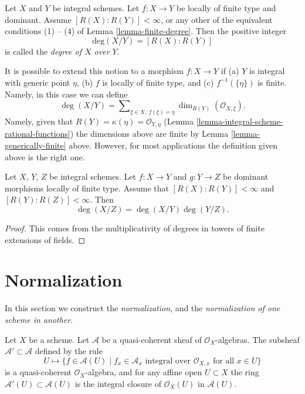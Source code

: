\begin{definition}
\label{definition-degree}
Let $X$ and $Y$ be integral schemes.
Let $f : X \to Y$ be locally of finite type and dominant.
Assume $[R(X) : R(Y)] < \infty$, or any other of the equivalent
conditions (1) -- (4) of Lemma \ref{lemma-finite-degree}.
Then the positive integer
$$
\text{deg}(X/Y) = [R(X) : R(Y)]
$$
is called the {\it degree of $X$ over $Y$}.
\end{definition}

\noindent
It is possible to extend this notion to a morphism
$f : X \to Y$ if (a) $Y$ is integral with generic point $\eta$,
(b) $f$ is locally of finite type, and (c) $f^{-1}(\{\eta\})$ is finite.
Namely, in this case we can define
$$
\deg(X/Y)
=
\sum\nolimits_{\xi \in X,\ f(\xi) = \eta}
\dim_{R(Y)} (\mathcal{O}_{X, \xi}).
$$
Namely, given that $R(Y) = \kappa(\eta) = \mathcal{O}_{Y, \eta}$
(Lemma \ref{lemma-integral-scheme-rational-functions})
the dimensions above are finite by
Lemma \ref{lemma-generically-finite} above.
However, for most applications the definition given above
is the right one.

\begin{lemma}
\label{lemma-degree-composition}
Let $X$, $Y$, $Z$ be integral schemes.
Let $f : X \to Y$ and $g : Y \to Z$ be dominant morphisms locally
of finite type. Assume that $[R(X) : R(Y)] < \infty$ and
$[R(Y) : R(Z)] < \infty$. Then
$$
\deg(X/Z) = \deg(X/Y) \deg(Y/Z).
$$
\end{lemma}

\begin{proof}
This comes from the multiplicativity of degrees in towers
of finite extensions of fields.
\end{proof}









\section{Normalization}
\label{section-normalization}

\noindent
In this section we construct the {\it normalization}, and the
{\it normalization of one scheme in another}.

\begin{lemma}
\label{lemma-integral-closure}
Let $X$ be a scheme. Let $\mathcal{A}$ be a quasi-coherent sheaf
of $\mathcal{O}_X$-algebras. The subsheaf $\mathcal{A}' \subset \mathcal{A}$
defined by the rule
$$
U \longmapsto \{f \in \mathcal{A}(U) \mid
f_x \in \mathcal{A}_x \text{ integral over } \mathcal{O}_{X, x}
\text{ for all }x \in U\}
$$
is a quasi-coherent $\mathcal{O}_X$-algebra, and for any affine open
$U \subset X$ the ring $\mathcal{A}'(U) \subset \mathcal{A}(U)$ is
the integral closure of $\mathcal{O}_X(U)$ in $\mathcal{A}(U)$.
\end{lemma}

